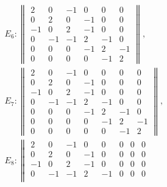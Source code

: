 \documentclass[10pt]{article}
\begin{document}
\[

\begin{aligned}

& E_{6}:\left\|\begin{array}{rrrrrr}

2 & 0 & -1 & 0 & 0 & 0 \\

0 & 2 & 0 & -1 & 0 & 0 \\

-1 & 0 & 2 & -1 & 0 & 0 \\

0 & -1 & -1 & 2 & -1 & 0 \\

0 & 0 & 0 & -1 & 2 & -1 \\

0 & 0 & 0 & 0 & -1 & 2

\end{array}\right\|, \\

& E_{7}:\left\|\begin{array}{rrrrrrr}

2 & 0 & -1 & 0 & 0 & 0 & 0 \\

0 & 2 & 0 & -1 & 0 & 0 & 0 \\

-1 & 0 & 2 & -1 & 0 & 0 & 0 \\

0 & -1 & -1 & 2 & -1 & 0 & 0 \\

0 & 0 & 0 & -1 & 2 & -1 & 0 \\

0 & 0 & 0 & 0 & -1 & 2 & -1 \\

0 & 0 & 0 & 0 & 0 & -1 & 2

\end{array}\right\| \text {, } \\

& E_{8}:\left\|\begin{array}{rrrrrrrr}

2 & 0 & -1 & 0 & 0 & 0 & 0 & 0 \\

0 & 2 & 0 & -1 & 0 & 0 & 0 & 0 \\

-1 & 0 & 2 & -1 & 0 & 0 & 0 & 0 \\

0 & -1 & -1 & 2 & -1 & 0 & 0 & 0 \\


\end{array}
\end{aligned}\]
\end{document}
